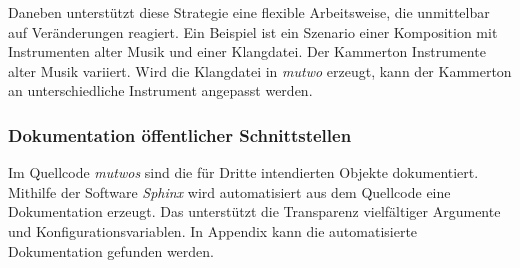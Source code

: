 \documentclass[12pt,a4paper,ngerman]{article}
\begin{document}
\vspace{-0.5cm}

\begin{center}
\end{center}

Daneben unterstützt diese Strategie eine flexible Arbeitsweise, die unmittelbar auf Veränderungen reagiert.
Ein Beispiel ist ein Szenario einer Komposition mit Instrumenten alter Musik und einer Klangdatei.
Der Kammerton Instrumente alter Musik variiert.
Wird die Klangdatei in \emph{mutwo} erzeugt, kann der Kammerton an unterschiedliche Instrument angepasst werden.

\subsubsection{Dokumentation öffentlicher Schnittstellen}

Im Quellcode \emph{mutwos} sind die für Dritte intendierten Objekte dokumentiert.
Mithilfe der Software \emph{Sphinx} wird automatisiert aus dem Quellcode eine Dokumentation erzeugt.
Das unterstützt die Transparenz vielfältiger Argumente und Konfigurationsvariablen.
In Appendix kann die automatisierte Dokumentation gefunden werden.
\end{document}
